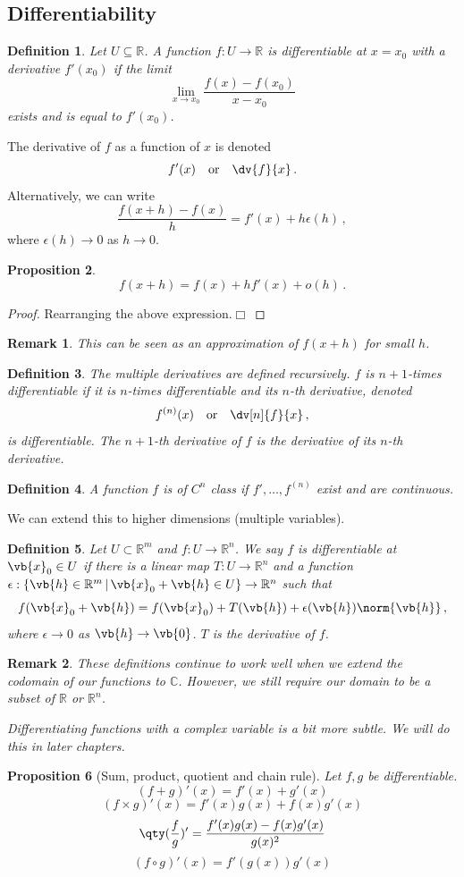 \documentclass{article}
\theoremstyle{plain}\theoremheaderfont{\normalfont\itshape}\theorembodyfont{\rmfamily}\theoremseparator{.}\newtheorem*{rem}{Remark}\newtheorem*{ex}{Example}\newtheorem*{proof}{Proof}\newtheorem*{altp}{Alternative proof}
\theoremstyle{plain}\theoremheaderfont{\normalfont\bfseries}\theorembodyfont{\rmfamily}\theoremseparator{.}\newtheorem{thm}{Theorem}[section]\newtheorem{lem}[thm]{Lemma}\newtheorem{prop}[thm]{Proposition}\newtheorem*{cor}{Corollary}\newtheorem{defn}[thm]{Definition}\newtheorem{clm}[thm]{Claim}\newtheorem{clminproof}{Claim}
\theoremstyle{break}\theoremheaderfont{\normalfont\itshape}\theorembodyfont{\rmfamily}\theoremseparator{.\medskip}\newtheorem*{proofskip}{Proof}\newtheorem*{exs}{Examples}\newtheorem*{rems}{Remarks}
\theoremstyle{break}\theoremheaderfont{\normalfont\bfseries}\theorembodyfont{\rmfamily}\theoremseparator{.\medskip}\newtheorem{lemskip}[thm]{Lemma}\newtheorem{defnskip}[thm]{Definition}\newtheorem{propskip}[thm]{Proposition}\newtheorem{thmskip}[thm]{Theorem}
\numberwithin{equation}{section}
\newcommand{\qed}{\hfill\ensuremath{\Box}}
\begin{document}
	\subsection{Differentiability}
	\begin{defn}
		Let \(U\subseteq\mathbb{R}\). A function \(f:U\to\mathbb{R}\) is \textit{differentiable} at \(x=x_0\) with a \textit{derivative} \(f'(x_0)\) if the limit
		\[\lim_{x\to x_0}\frac{f(x)-f(x_0)}{x-x_0}\]
		exists and is equal to \(f'(x_0)\).
	\end{defn}
	The derivative of \(f\) as a function of \(x\) is denoted
		\[f'(x)\quad\text{or}\quad\dv{f}{x}\,.\]
	Alternatively, we can write
	\[\frac{f(x+h)-f(x)}{h}=f'(x)+h\epsilon(h)\,,\]
	where \(\epsilon(h)\to 0\) as \(h\to 0\).
	\begin{prop}
		\[f(x+h)=f(x)+hf'(x)+o(h)\,.\]
	\end{prop}
	\begin{proof}
		Rearranging the above expression.\qed
	\end{proof}
	\begin{rem}
		This can be seen as an approximation of \(f(x+h)\) for small \(h\).
	\end{rem}
	\begin{defn}
		The \textit{multiple derivatives} are defined recursively. \(f\) is \(n+1\)-times differentiable if it is \(n\)-times differentiable and its \(n\)-th derivative, denoted
		\[f^{(n)}(x)\quad\text{or}\quad\dv[n]{f}{x}\,,\]
		is differentiable. The \(n+1\)-th derivative of \(f\) is the derivative of its \(n\)-th derivative.
	\end{defn}
	\begin{defn}
		A function \(f\) is of \(C^n\) class if \(f',\dots,f^{(n)}\) exist and are continuous. 
	\end{defn}

	We can extend this to higher dimensions (multiple variables).

	\begin{defn}
		Let \(U\subset\mathbb{R}^m\) and \(f:U\to\mathbb{R}^n\). We say \(f\) is \textit{differentiable} at \(\vb{x}_0\in U\) if there is a linear map \(T:U\to\mathbb{R}^n\) and a function \(\epsilon:\{\vb{h}\in\mathbb{R}^m\,|\,\vb{x}_0+\vb{h}\in U\}\to\mathbb{R}^n\) such that
		\[f(\vb{x}_0+\vb{h})=f(\vb{x}_0)+T(\vb{h})+\epsilon(\vb{h})\norm{\vb{h}}\,,\]
		where \(\epsilon\to 0\) as \(\vb{h}\to\vb{0}\). \(T\) is the derivative of \(f\).
	\end{defn}
	\begin{rem}
		These definitions continue to work well when we extend the codomain of our functions to \(\mathbb{C}\). However, we still require our domain to be a subset of \(\mathbb{R}\) or \(\mathbb{R}^n\).

		Differentiating functions with a complex variable is a bit more subtle. We will do this in later chapters.
	\end{rem}
	\begin{prop}[Sum, product, quotient and chain rule]
		Let \(f,g\) be differentiable.
		\[(f+g)'(x)=f'(x)+g'(x)\]
		\[(f\times g)'(x)=f'(x)g(x)+f(x)g'(x)\]
		\[\qty(\frac{f}{g})'=\frac{f'(x)g(x)-f(x)g'(x)}{g(x)^2}\]
		\[(f\circ g)'(x)=f'(g(x))g'(x)\]	
	\end{prop}
\end{document}
